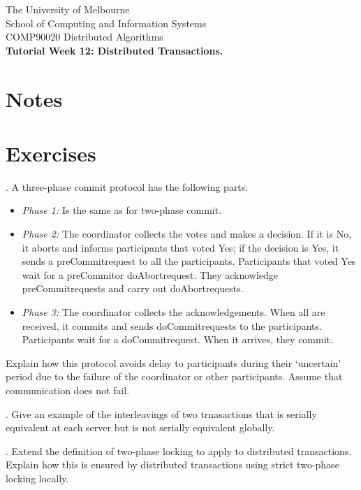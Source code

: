 \documentclass[12pt]{article}
\newcounter{question}
\newcommand{\question}[1]{
    \stepcounter{question}
    \thequestion. #1 \hfill
}
\begin{document}
\begin{center}
    {\sc The University of Melbourne
        \\
        School of Computing and Information Systems
        \\
    COMP90020 Distributed Algorithms}
    \bigskip \\
    {\Large\bf Tutorial Week 12: Distributed Transactions.}
    \bigskip \\
\end{center}

\section*{Notes}

\section*{Exercises}

\setcounter{question}{50}

\question{A three-phase commit protocol has the following parts:}


\begin{itemize}
    \item \textit{Phase 1:} Is the same as for two-phase commit.
    \item \textit{Phase 2:} The coordinator collects the votes and makes a decision. If it is No, it aborts and informs participants that voted Yes; if the decision is Yes, it sends a preCommitrequest to all the participants. Participants that voted Yes wait for a preCommitor doAbortrequest. They acknowledge preCommitrequests and carry out doAbortrequests.
    \item \textit{Phase 3:} The coordinator collects the acknowledgements. When all are received, it commits and sends doCommitrequests to the participants. Participants wait for a doCommitrequest. When it arrives, they commit.
\end{itemize}

Explain how this protocol avoids delay to participants during their ‘uncertain’ period due to the failure of the coordinator or other participants. Assume that communication does not fail.

\question{Give an example of the interleavings of two trnasactions that is serially equivalent at each server but is not serially equivalent globally.}

\question{Extend the definition of two-phase locking to apply to distributed transactions. Explain how this is ensured by distributed transactions using strict two-phase locking locally.}
\end{document}
